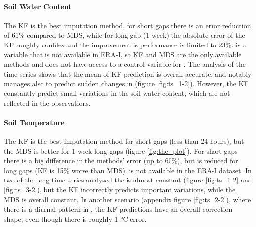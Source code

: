 \documentclass{article}
\begin{document}
\paragraph{Soil Water Content} The KF is the best imputation method, for short gaps there is an error reduction of 61\% compared to MDS, while for long gap (1 week) the absolute error of the KF roughly doubles and the improvement is performance is limited to 23\%.  is a variable that is not available in ERA-I, so KF and MDS are the only available methods and does not have access to a control variable for .
The analysis of the time series shows that the mean of KF prediction is overall accurate, and notably manages also to predict sudden changes in  (figure \ref{fig:ts_1-2}). However, the KF constantly predict small variations in the soil water content, which are not reflected in the observations.

\paragraph{Soil Temperature} The KF is the best imputation method for short gaps (less than 24 hours), but the MDS is better for 1 week long gaps (figure \ref{fig:the_plot}). For short gaps there is a big difference in the methods' error (up to 60\%), but is reduced for long gaps (KF is 15\% worse than MDS).
 is not available in the ERA-I dataset.
In two of the long time series analysed the  is almost constant (figure \ref{fig:ts_1-2} and \ref{fig:ts_3-2}), but the KF incorrectly predicts important variations, while the MDS is overall constant. In another scenario (appendix figure \ref{fig:ts_2-2}), where there is a diurnal pattern in , the KF predictions have an overall correction shape, even though there is roughly 1 °C error.


\newcommand{\CapTs}[2]{#1 to visualize the imputation of #2 using different methods: Kalman Filter, ERA-Interim (ERA-I) and Marginal Distribution Sampling (MDS). For each variable, 3 random artificial gap (length 6 hours, 12 hours, 1 week) are imputed using the three methods: Kalman Filter (green), ERA-I (orange), MDS (purple).  For the Kalman Filter the shared area show the uncertainty of the prediction $\pm 2 \sigma$ (standard deviation). The grey shaded area and the vertical black lines delimit the artificial gaps, where the observations are not available to the model but are used to assess the imputation performance. The ERA-I prediction is the control variable of the Kalman Filter. The Kalman Filter model has been fine-tuned to each variable (\textit{KF-\textlangle var\textrangle-Sin-6\_336}).}
\end{document}
